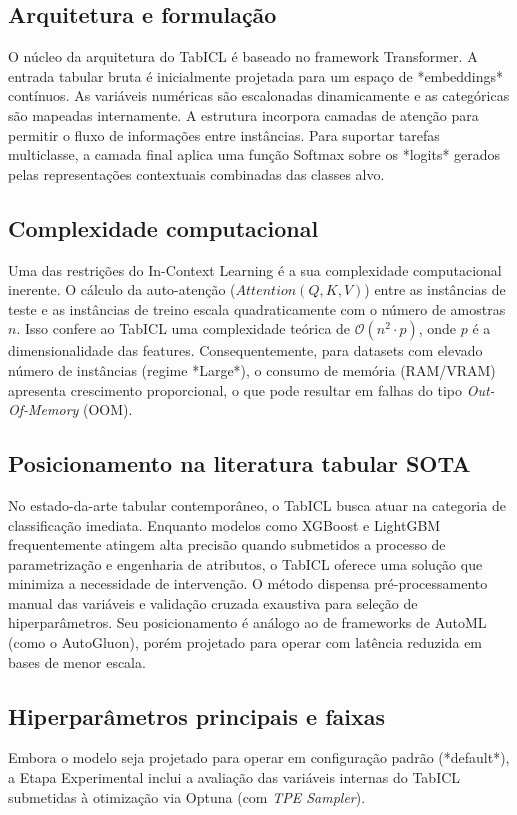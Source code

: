 \documentclass[12pt,a4paper]{article}
\begin{document}
\subsection{Arquitetura e formulação}
O núcleo da arquitetura do TabICL é baseado no framework Transformer. A entrada tabular bruta é inicialmente projetada para um espaço de *embeddings* contínuos. As variáveis numéricas são escalonadas dinamicamente e as categóricas são mapeadas internamente. A estrutura incorpora camadas de atenção para permitir o fluxo de informações entre instâncias. Para suportar tarefas multiclasse, a camada final aplica uma função Softmax sobre os *logits* gerados pelas representações contextuais combinadas das classes alvo.

\subsection{Complexidade computacional}
Uma das restrições do In-Context Learning é a sua complexidade computacional inerente. O cálculo da auto-atenção ($Attention(Q,K,V)$) entre as instâncias de teste e as instâncias de treino escala quadraticamente com o número de amostras $n$. Isso confere ao TabICL uma complexidade teórica de $\mathcal{O}(n^2 \cdot p)$, onde $p$ é a dimensionalidade das features. Consequentemente, para datasets com elevado número de instâncias (regime *Large*), o consumo de memória (RAM/VRAM) apresenta crescimento proporcional, o que pode resultar em falhas do tipo \textit{Out-Of-Memory} (OOM).

\subsection{Posicionamento na literatura tabular SOTA}
No estado-da-arte tabular contemporâneo, o TabICL busca atuar na categoria de classificação imediata. Enquanto modelos como XGBoost e LightGBM frequentemente atingem alta precisão quando submetidos a processo de parametrização e engenharia de atributos, o TabICL oferece uma solução que minimiza a necessidade de intervenção. O método dispensa pré-processamento manual das variáveis e validação cruzada exaustiva para seleção de hiperparâmetros. Seu posicionamento é análogo ao de frameworks de AutoML (como o AutoGluon), porém projetado para operar com latência reduzida em bases de menor escala.

\subsection{Hiperparâmetros principais e faixas}
Embora o modelo seja projetado para operar em configuração padrão (*default*), a Etapa Experimental inclui a avaliação das variáveis internas do TabICL submetidas à otimização via Optuna (com \textit{TPE Sampler}).
\end{document}
